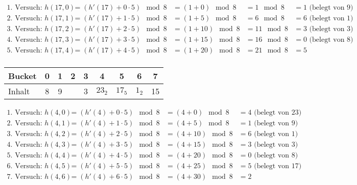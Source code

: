 \documentclass{lehramt-informatik-aufgabe}
\begin{document}
\begin{enumerate}
\begin{antwort}
{\tiny
\begin{equation*}
\begin{aligned}
\text{1. Versuch: } h(17, 0) &= (h'(17) + 0 \cdot 5) \mod 8 &= (1 + 0) \mod 8  &= 1 \mod 8  &= 1 \text{ (belegt von } 9)\\
\text{2. Versuch: } h(17, 1) &= (h'(17) + 1 \cdot 5) \mod 8 &= (1 + 5) \mod 8  &= 6 \mod 8  &= 6 \text{ (belegt von } 1)\\
\text{3. Versuch: } h(17, 2) &= (h'(17) + 2 \cdot 5) \mod 8 &= (1 + 10) \mod 8 &= 11 \mod 8 &= 3 \text{ (belegt von } 3)\\
\text{4. Versuch: } h(17, 3) &= (h'(17) + 3 \cdot 5) \mod 8 &= (1 + 15) \mod 8 &= 16 \mod 8 &= 0 \text{ (belegt von } 8)\\
\text{5. Versuch: } h(17, 4) &= (h'(17) + 4 \cdot 5) \mod 8 &= (1 + 20) \mod 8 &= 21 \mod 8 &= 5\\
\end{aligned}
\end{equation*}
}


\begin{center}
\begin{tabular}{l|cccccccc}
Bucket    & 0  & 1 & 2     & 3 & 4      & 5      & 6     & 7 \\\hline
Inhalt    & 8  & 9 &       & 3 & $23_2$ & $17_5$ & $1_2$ & 15 \\
\end{tabular}
\end{center}

{\tiny
\begin{equation*}
\begin{aligned}
\text{1. Versuch: } h(4, 0) &= (h'(4) + 0 \cdot 5) \mod 8 &= (4 + 0) \mod 8  &= 4 \text{ (belegt von } 23)\\
\text{2. Versuch: } h(4, 1) &= (h'(4) + 1 \cdot 5) \mod 8 &= (4 + 5) \mod 8  &= 1 \text{ (belegt von } 9)\\
\text{3. Versuch: } h(4, 2) &= (h'(4) + 2 \cdot 5) \mod 8 &= (4 + 10) \mod 8 &= 6 \text{ (belegt von } 1)\\
\text{4. Versuch: } h(4, 3) &= (h'(4) + 3 \cdot 5) \mod 8 &= (4 + 15) \mod 8 &= 3 \text{ (belegt von } 3)\\
\text{5. Versuch: } h(4, 4) &= (h'(4) + 4 \cdot 5) \mod 8 &= (4 + 20) \mod 8 &= 0 \text{ (belegt von } 8)\\
\text{6. Versuch: } h(4, 5) &= (h'(4) + 5 \cdot 5) \mod 8 &= (4 + 25) \mod 8 &= 5 \text{ (belegt von } 17)\\
\text{7. Versuch: } h(4, 6) &= (h'(4) + 6 \cdot 5) \mod 8 &= (4 + 30) \mod 8 &= 2 \\
\end{aligned}
\end{equation*}
}


\end{antwort}
\end{enumerate}
\end{document}

